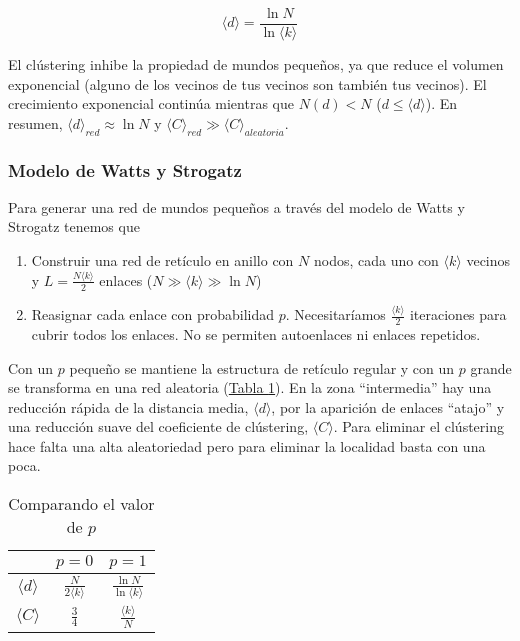 \documentclass[10pt,spanish, landscape, twocolumn]{article}
\begin{document}
\begin{displaymath}
    \langle d \rangle = \frac{\ln N}{\ln \langle k \rangle}
\end{displaymath}

El clústering inhibe la propiedad de mundos pequeños, ya que reduce el volumen exponencial (alguno de los vecinos de tus vecinos son también tus vecinos). El crecimiento exponencial continúa mientras que $N(d) < N$ ($d \leq \langle d \rangle$). En resumen, $\langle d \rangle_{red} \approx \ln N$ y $\langle C \rangle_{red} \gg \langle C \rangle_{aleatoria}$.

\subsubsection{\textcolor{temacinco}Modelo de Watts y Strogatz}
Para generar una red de mundos pequeños a través del modelo de Watts y Strogatz tenemos que

\begin{enumerate}[1.]
    \item Construir una red de retículo en anillo con $N$ nodos, cada uno con $\langle k \rangle$ vecinos y $L = \frac{N \langle k \rangle}{2}$ enlaces ($N \gg \langle k \rangle \gg \ln N$)
    \item Reasignar cada enlace con probabilidad $p$. Necesitaríamos $\frac{\langle k \rangle}{2}$ iteraciones para cubrir todos los enlaces. No se permiten autoenlaces ni enlaces repetidos.
\end{enumerate}

Con un $p$ pequeño se mantiene la estructura de retículo regular y con un $p$ grande se transforma en una red aleatoria (\hyperref[p]{Tabla \ref*{p}}). En la zona ``intermedia'' hay una reducción rápida de la distancia media, $\langle d \rangle$, por la aparición de enlaces ``atajo'' y una reducción suave del coeficiente de clústering, $\langle C \rangle$. Para eliminar el clústering hace falta una alta aleatoriedad pero para eliminar la localidad basta con una poca.

\begin{table}[!h]
\centering
\begin{tabular}{c | c | c}
& $p = 0$ & $p = 1$\\
\hline
$\langle d \rangle$ & $\frac{N}{2 \langle k \rangle}$ & $\frac{\ln N}{\ln \langle k \rangle}$ \\
$\langle C \rangle$ & $\frac{3}{4}$ & $\frac{\langle k \rangle}{N}$ \\
\end{tabular}
\caption{Comparando el valor de $p$}
\label{p}
\end{table}
\end{document}
